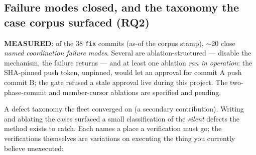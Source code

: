 \documentclass[10pt,conference]{IEEEtran}   %
\begin{document}
\subsection{Failure modes closed, and the taxonomy the case corpus surfaced (RQ2)}
\label{sec:taxonomy}
\textbf{MEASURED}: of the 38 \texttt{fix} commits (as-of the corpus stamp), $\sim$20 close \emph{named coordination failure modes}.
Several are ablation-structured --- disable the mechanism, the failure returns --- and
at least one ablation \emph{ran in operation}: the SHA-pinned push token, unpinned, would let
an approval for commit A push commit B; the gate refused a stale approval live during
this project. The two-phase-commit and member-cursor ablations are specified and pending.

A defect taxonomy the fleet converged on (a secondary contribution). Writing and
ablating the cases surfaced a small classification of the \emph{silent} defects the
method exists to catch. Each names a place a verification must go; the verifications
themselves are variations on executing the thing you currently believe unexecuted:
\end{document}
